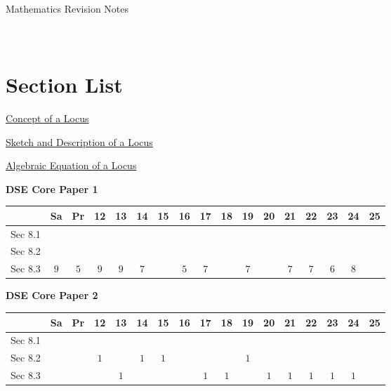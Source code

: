 \documentclass[12pt, a4paper]{article}
\begin{document}
\newpage
\newpage
\thispagestyle{empty}
\begin{center}
Mathematics Revision Notes\\\vspace{1cm}
\\\vspace{1cm}
{\fontsize{24pt}{24pt}\selectfont {Locus}} \\\vspace{1cm}
\label{chapter:S5-8}

\end{center}
\vspace{0.5cm}
\hline
\section*{Section List}
\begin{enumx}[label=Sec 8.\arabic*\ ]
\item \hyperref[section:5-8-1]{Concept of a Locus}
\item \hyperref[section:5-8-2]{Sketch and Description of a Locus}
\item \hyperref[section:5-8-3]{Algebraic Equation of a Locus}
\end{enumx}
\begin{absolutelynopagebreak}
\begin{center}
\textbf{DSE Core Paper 1}
\end{center}
\begin{center}
\begin{tabular}{|l|c|c|c|c|c|c|c|c|c|c|c|c|c|c|c|c|}
\hline
        & Sa & Pr & 12 & 13 & 14 & 15 & 16 & 17 & 18 & 19 & 20 & 21 & 22 & 23 & 24 & 25 \\\hline\hline
Sec 8.1 &  &  &  &  &  &  &  &  &  &  &  &  &  &  &  &  \\\hline
Sec 8.2 &  &  &  &  &  &  &  &  &  &  &  &  &  &  &  &  \\\hline
Sec 8.3 &  $9$ &  $5$ &  $9$ &  $9$ &  $7$ &  &  $5$ &  $7$ &  &  $7$ &  &  $7$ &  $7$ &  $6$ &  $8$ &  \\\hline
\end{tabular}
\end{center}
\end{absolutelynopagebreak}
\begin{absolutelynopagebreak}
\begin{center}
\textbf{DSE Core Paper 2}
\end{center}
\begin{center}
\begin{tabular}{|l|c|c|c|c|c|c|c|c|c|c|c|c|c|c|c|c|}
\hline
        & Sa & Pr & 12 & 13 & 14 & 15 & 16 & 17 & 18 & 19 & 20 & 21 & 22 & 23 & 24 & 25 \\\hline\hline
Sec 8.1 &  &  &  &  &  &  &  &  &  &  &  &  &  &  &  &  \\\hline
Sec 8.2 &  &  &  $1$ &  &  $1$ &  $1$ &  &  &  &  $1$ &  &  &  &  &  &  \\\hline
Sec 8.3 &  &  &  &  $1$ &  &  &  &  $1$ &  $1$ &  &  $1$ &  $1$ &  $1$ &  $1$ &  $1$ &  \\\hline
\end{tabular}
\end{center}
\end{absolutelynopagebreak}
\end{document}
